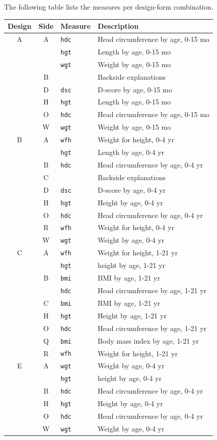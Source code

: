 \documentclass[
]{book}
\begin{document}
The following table lists the measures per design-form combination.

\begin{longtable}[]{@{}ccll@{}}
\toprule()
Design & Side & Measure & Description \\
\midrule()
\endhead
A & A & \texttt{hdc} & Head circumference by age, 0-15 mo \\
& & \texttt{hgt} & Length by age, 0-15 mo \\
& & \texttt{wgt} & Weight by age, 0-15 mo \\
& B & & Backside explanations \\
& D & \texttt{dsc} & D-score by age, 0-15 mo \\
& H & \texttt{hgt} & Length by age, 0-15 mo \\
& O & \texttt{hdc} & Head circumference by age, 0-15 mo \\
& W & \texttt{wgt} & Weight by age, 0-15 mo \\
B & A & \texttt{wfh} & Weight for height, 0-4 yr \\
& & \texttt{hgt} & Length by age, 0-4 yr \\
& B & \texttt{hdc} & Head circumference by age, 0-4 yr \\
& C & & Backside explanations \\
& D & \texttt{dsc} & D-score by age, 0-4 yr \\
& H & \texttt{hgt} & Height by age, 0-4 yr \\
& O & \texttt{hdc} & Head circumference by age, 0-4 yr \\
& R & \texttt{wfh} & Weight for height, 0-4 yr \\
& W & \texttt{wgt} & Weight by age, 0-4 yr \\
C & A & \texttt{wfh} & Weight for height, 1-21 yr \\
& & \texttt{hgt} & height by age, 1-21 yr \\
& B & \texttt{bmi} & BMI by age, 1-21 yr \\
& & \texttt{hdc} & Head circumference by age, 1-21 yr \\
& C & \texttt{bmi} & BMI by age, 1-21 yr \\
& H & \texttt{hgt} & Height by age, 1-21 yr \\
& O & \texttt{hdc} & Head circumference by age, 1-21 yr \\
& Q & \texttt{bmi} & Body mass index by age, 1-21 yr \\
& R & \texttt{wfh} & Weight for height, 1-21 yr \\
E & A & \texttt{wgt} & Weight by age, 0-4 yr \\
& & \texttt{hgt} & height by age, 0-4 yr \\
& B & \texttt{hdc} & Head circumference by age, 0-4 yr \\
& H & \texttt{hgt} & Height by age, 0-4 yr \\
& O & \texttt{hdc} & Head circumference by age, 0-4 yr \\
& W & \texttt{wgt} & Weight by age, 0-4 yr \\
\bottomrule()
\end{longtable}
\end{document}
